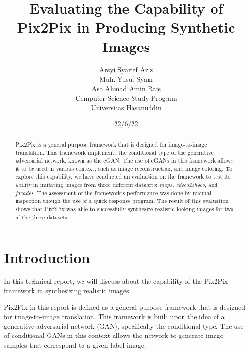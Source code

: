 \documentclass[peerreview]{IEEEtran}
\begin{document}
\title{Evaluating the Capability of Pix2Pix in Producing Synthetic Images}



\author{Arsyi Syarief Aziz \\ Muh. Yusuf Syam \\ Aso Ahmad Amin Rais \\
Computer Science Study Program\\
Universitas Hasanuddin\\
}
\date{22/6/22}

\maketitle
\tableofcontents
\listoffigures
\listoftables

\IEEEpeerreviewmaketitle
\begin{abstract}
Pix2Pix is a general purpose framework that is designed for image-to-image translation. This framework implements the conditional type of the generative adversarial network, known as the cGAN. The use of cGANs in this framework allows it to be used in various context, such as image reconstruction, and image coloring. To explore this capability, we have conducted an evaluation on the framework to test its ability in imitating images from three different datasets: \textit{maps}, \textit{edges2shoes}, and \textit{facades}. The assessment of the framework's performance was done by manual inspection though the use of a quick response program. The result of this evaluation shows that Pix2Pix was able to successfully synthesize realistic looking images for two of the three datasets.

\end{abstract}

\section{Introduction}
In this technical report, we will discuss about the capability of the Pix2Pix framework in synthesizing realistic images.

Pix2Pix in this report is defined as a general purpose framework that is designed for image-to-image translation. This framework is built upon the idea of a generative adversarial network (GAN), specifically the conditional type. The use of conditional GANs in this context allows the network to generate image samples that correspond to a given label image. 
\end{document}

